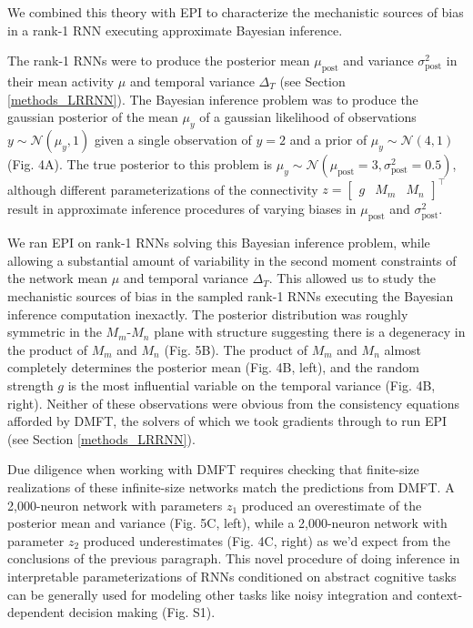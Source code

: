 \documentclass[11pt]{article}
\begin{document}
We combined this theory with EPI to characterize the mechanistic sources of bias in a rank-1 RNN executing approximate Bayesian inference.

The rank-1 RNNs were to produce the posterior mean $\mu_{\text{post}}$ and variance $\sigma^2_{\text{post}}$ in their mean activity $\mu$ and temporal variance $\Delta_T$ (see Section \ref{methods_LRRNN}).  The Bayesian inference problem was to produce the gaussian posterior of the mean $\mu_y$ of a gaussian likelihood of observations $y \sim \mathcal{N}(\mu_y, 1)$ given a single observation of $y=2$ and a prior of $\mu_y \sim \mathcal{N}(4, 1)$ (Fig. 4A). The true posterior to this problem is $\mu_y \sim \mathcal{N}(\mu_{\text{post}}=3, \sigma^2_{\text{post}}=0.5)$, although different parameterizations of the connectivity $z = \begin{bmatrix} g & M_m & M_n \end{bmatrix}^\top$ result in approximate inference procedures of varying biases in $\mu_{\text{post}}$ and $\sigma^2_{\text{post}}$.

We ran EPI on rank-1 RNNs solving this Bayesian inference problem, while allowing a substantial amount of variability in the second moment constraints of the network mean $\mu$ and temporal variance $\Delta_T$.  
This allowed us to study the mechanistic sources of bias in the sampled rank-1 RNNs executing the Bayesian inference computation inexactly.
The posterior distribution was roughly symmetric in the $M_m$-$M_n$ plane with structure suggesting there is a degeneracy in the product of $M_m$ and $M_n$ (Fig. 5B).  
The product of $M_m$ and $M_n$ almost completely determines the posterior mean (Fig. 4B, left), and the random strength $g$ is the most influential variable on the temporal variance (Fig. 4B, right).
Neither of these observations were obvious from the consistency equations afforded by DMFT, the solvers of which we took gradients through to run EPI (see Section \ref{methods_LRRNN}).
 
Due diligence when working with DMFT requires checking that finite-size realizations of these infinite-size networks match the predictions from DMFT.  A 2,000-neuron network with parameters $z_1$ produced an overestimate of the  posterior mean and variance (Fig. 5C, left), while a 2,000-neuron network with parameter $z_2$ produced underestimates (Fig. 4C, right) as we'd expect from the conclusions of the previous paragraph.  This novel procedure of doing inference in interpretable parameterizations of RNNs conditioned on abstract cognitive tasks can be generally used for modeling other tasks like noisy integration and context-dependent decision making (Fig. S1).
\end{document}
